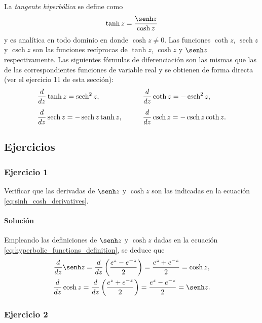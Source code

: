 \documentclass[a4paper]{report}
\DeclareMathOperator{\sech}{sech}
\DeclareMathOperator{\csch}{csch}
\begin{document}
La \emph{tangente hiperbólica} se define como
\begin{equation}\label{eq:hyperbolic_functions_tanh_definition}
 \tanh z=\frac{\senh z}{\cosh z} 
\end{equation}
y es analítica en todo dominio en donde \(\cosh z\neq0\). Las funciones \(\coth z\), \(\sech z\) y \(\csch z\) son las funciones recíprocas de \(\tanh z\), \(\cosh z\) y \(\senh z\) respectivamente. Las siguientes fórmulas de diferenciación son las mismas que las de las correspondientes funciones de variable real y se obtienen de forma directa (ver el ejercicio 11 de esta sección):
\begin{equation}\label{eq:hyperbolic_functions_reciprocal_derivatives}
 \begin{array}{ll}
  \dfrac{d}{dz}\tanh z=\sech^2z, &\qquad\dfrac{d}{dz}\coth z=-\csch^2z,\\[\bigskipamount]
  \dfrac{d}{dz}\sech z=-\sech z\tanh z, &\qquad\dfrac{d}{dz}\csch z=-\csch z\coth z. 
 \end{array} 
\end{equation}

\subsection*{Ejercicios}

\subsubsection{Ejercicio 1}

Verificar que las derivadas de \(\senh z\) y \(\cosh z\) son las indicadas en la ecuación \ref{eq:sinh_cosh_derivatives}.

\paragraph{Solución} Empleando las definiciones de \(\senh z\) y \(\cosh z\) dadas en la ecuación \ref{eq:hyperbolic_functions_definition}, se deduce que 
\begin{gather*}
 \frac{d}{dz}\senh z=\frac{d}{dz}\left(\frac{e^z-e^{-z}}{2}\right)=\frac{e^z+e^{-z}}{2}=\cosh z,\\
 \frac{d}{dz}\cosh z=\frac{d}{dz}\left(\frac{e^z+e^{-z}}{2}\right)=\frac{e^z-e^{-z}}{2}=\senh z.
\end{gather*}

\subsubsection{Ejercicio 2}
\end{document}
